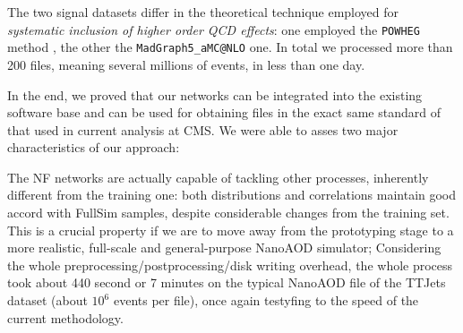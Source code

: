 The two signal datasets differ in the theoretical technique employed for \emph{systematic inclusion of higher order QCD effects}: one employed the \texttt{POWHEG} method \cite{Nason_2004}, the other the \texttt{MadGraph5\_aMC@NLO} \cite{powpow} one.
In total we processed more than 200 files, meaning several millions of events, in less than one day.

In the end, we proved that our networks can be integrated into the existing software base and can be used for obtaining files in the exact same standard of that used in current analysis at CMS. We were able to asses two major characteristics of our approach:

\begin{outline}
    \1 The NF networks are actually capable of tackling other processes, inherently different from the training one: both distributions and correlations maintain good accord with FullSim samples, despite considerable changes from the training set. This is a crucial property if we are to move away from the prototyping stage to a more realistic, full-scale and general-purpose NanoAOD simulator;
    \1 Considering the whole preprocessing/postprocessing/disk writing overhead, the whole process took about 440 second or 7 minutes on the typical NanoAOD file of the TTJets dataset (about $10^{6}$ events per file), once again testyfing to the speed of the current methodology.
\end{outline}
